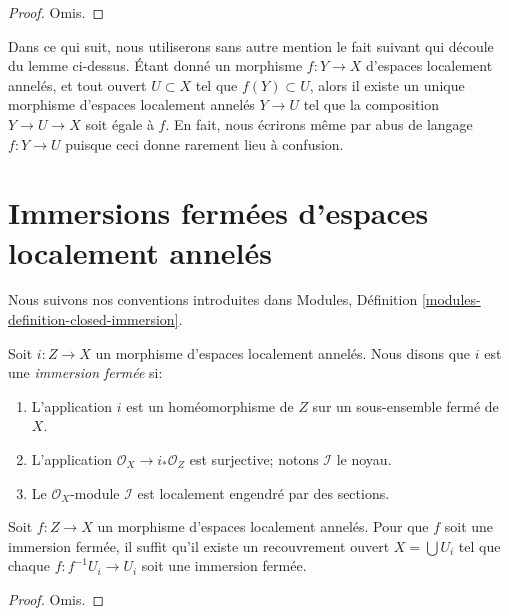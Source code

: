 \begin{proof}
Omis.
\end{proof}

\noindent
Dans ce qui suit, nous utiliserons sans autre mention le fait suivant qui découle
du lemme ci-dessus. Étant donné un morphisme  $f : Y \to X$  d'espaces localement
annelés, et tout ouvert  $U \subset X$  tel que  $f(Y) \subset U$, alors il existe un
unique morphisme d'espaces localement annelés  $Y \to U$  tel que la composition
 $Y \to U \to X$  soit égale à  $f$. En fait, nous écrirons même par abus de
langage  $f : Y \to U$  puisque ceci donne rarement lieu à confusion.









\section{Immersions fermées d'espaces localement annelés}
\label{section-closed-immersion}

\noindent
Nous suivons nos conventions introduites dans Modules, Définition  \ref{modules-definition-closed-immersion}.

\begin{definition}
\label{definition-closed-immersion-locally-ringed-spaces}
Soit  $i : Z \to X$  un morphisme d'espaces localement annelés. Nous disons que
 $i$  est une  {\it  immersion fermée}  si:
\begin{enumerate}
\item L'application  $i$  est un homéomorphisme de  $Z$  sur un
sous-ensemble fermé de  $X$.
\item L'application  $\mathcal{O}_X \to i_*\mathcal{O}_Z$  est surjective; notons  $\mathcal{I}$  le noyau.
\item Le  $\mathcal{O}_X$-module  $\mathcal{I}$  est localement engendré par des sections.
\end{enumerate}
\end{definition}

\begin{lemma}
\label{lemma-closed-local-target}
Soit  $f : Z \to X$  un morphisme d'espaces localement annelés. Pour que  $f$ 
soit une immersion fermée, il suffit qu'il existe un recouvrement ouvert
 $X = \bigcup U_i$  tel que chaque  $f : f^{-1}U_i \to U_i$  soit une immersion fermée.
\end{lemma}

\begin{proof}
Omis.
\end{proof}

